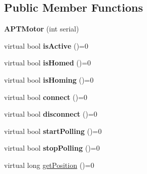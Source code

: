 \subsection*{Public Member Functions}
\begin{DoxyCompactItemize}
\item 
{\bfseries A\+P\+T\+Motor} (int serial)\hypertarget{class_a_p_t_motor_a05a9fe8575fe7bfaf73d285704989827}{}\label{class_a_p_t_motor_a05a9fe8575fe7bfaf73d285704989827}

\item 
virtual bool {\bfseries is\+Active} ()=0\hypertarget{class_a_p_t_motor_a7796d2ed550cb3642a9a97e2f99f781c}{}\label{class_a_p_t_motor_a7796d2ed550cb3642a9a97e2f99f781c}

\item 
virtual bool {\bfseries is\+Homed} ()=0\hypertarget{class_a_p_t_motor_afb1d3d08eb946872d65d78d3c40afc04}{}\label{class_a_p_t_motor_afb1d3d08eb946872d65d78d3c40afc04}

\item 
virtual bool {\bfseries is\+Homing} ()=0\hypertarget{class_a_p_t_motor_aa85ccf20174e8c15d3eb5e20e7811e1c}{}\label{class_a_p_t_motor_aa85ccf20174e8c15d3eb5e20e7811e1c}

\item 
virtual bool {\bfseries connect} ()=0\hypertarget{class_a_p_t_motor_a283bc93f03eb9a54ebfab749444cb739}{}\label{class_a_p_t_motor_a283bc93f03eb9a54ebfab749444cb739}

\item 
virtual bool {\bfseries disconnect} ()=0\hypertarget{class_a_p_t_motor_a5370e0fdf73cf0e241f493ab5d4418b9}{}\label{class_a_p_t_motor_a5370e0fdf73cf0e241f493ab5d4418b9}

\item 
virtual bool {\bfseries start\+Polling} ()=0\hypertarget{class_a_p_t_motor_a61ced435fd126a5d04566d76265ad6aa}{}\label{class_a_p_t_motor_a61ced435fd126a5d04566d76265ad6aa}

\item 
virtual bool {\bfseries stop\+Polling} ()=0\hypertarget{class_a_p_t_motor_a87ac54bf651f4bb21edb754326f07221}{}\label{class_a_p_t_motor_a87ac54bf651f4bb21edb754326f07221}

\item 
virtual long \hyperlink{class_a_p_t_motor_ac2ebfd02659a1b1ef8847f99ce7db9ee}{get\+Position} ()=0\hypertarget{class_a_p_t_motor_ac2ebfd02659a1b1ef8847f99ce7db9ee}{}\label{class_a_p_t_motor_ac2ebfd02659a1b1ef8847f99ce7db9ee}


\end{DoxyCompactItemize}
